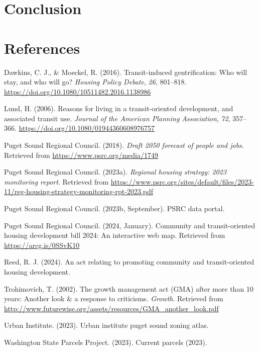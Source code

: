 \documentclass[
]{agujournal2019}
\newlength{\cslhangindent}
\newenvironment{CSLReferences}[2] %
 {\begin{list}{}{%
  \setlength{\itemindent}{0pt}
  \setlength{\leftmargin}{0pt}
  \setlength{\parsep}{0pt}
  \ifodd #1
   \setlength{\leftmargin}{\cslhangindent}
   \setlength{\itemindent}{-1\cslhangindent}
  \fi
  \setlength{\itemsep}{#2\baselineskip}}}
 {\end{list}}
\begin{document}
\section{Conclusion}\label{conclusion}

\section*{References}\label{references}

\label{refs}
\begin{CSLReferences}{1}{0}
\vspace{1em}

Dawkins, C. J., \& Moeckel, R. (2016). Transit-induced gentrification:
Who will stay, and who will go? \emph{Housing Policy Debate}, \emph{26},
801--818. \url{https://doi.org/10.1080/10511482.2016.1138986}

Lund, H. (2006). Reasons for living in a transit-oriented development,
and associated transit use. \emph{Journal of the American Planning
Association}, \emph{72}, 357--366.
\url{https://doi.org/10.1080/01944360608976757}

Puget Sound Regional Council. (2018). \emph{Draft 2050 forecast of
people and jobs}. Retrieved from \url{https://www.psrc.org/media/1749}

Puget Sound Regional Council. (2023a). \emph{Regional housing strategy:
2023 monitoring report}. Retrieved from
\url{https://www.psrc.org/sites/default/files/2023-11/reg-housing-strategy-monitoring-rpt-2023.pdf}

Puget Sound Regional Council. (2023b, September). PSRC data portal.

Puget Sound Regional Council. (2024, January). Community and
transit-oriented housing development bill 2024: An interactive web map.
Retrieved from \url{https://arcg.is/0SSvK10}

Reed, R. J. (2024). An act relating to promoting community and
transit-oriented housing development.

Trohimovich, T. (2002). The growth management act (GMA) after more than
10 years: Another look \& a response to criticisms. \emph{Growth}.
Retrieved from
\url{http://www.futurewise.org/assets/resources/GMA_another_look.pdf}

Urban Institute. (2023). Urban institute puget sound zoning atlas.

Washington State Parcels Project. (2023). Current parcels (2023).

\end{CSLReferences}
\end{document}
